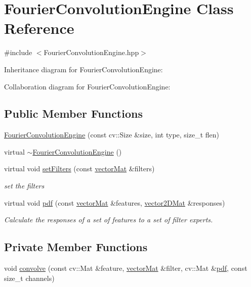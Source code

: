 \hypertarget{classFourierConvolutionEngine}{}\section{Fourier\+Convolution\+Engine Class Reference}
\label{classFourierConvolutionEngine}


{\ttfamily \#include $<$Fourier\+Convolution\+Engine.\+hpp$>$}



Inheritance diagram for Fourier\+Convolution\+Engine\+:


Collaboration diagram for Fourier\+Convolution\+Engine\+:
\subsection*{Public Member Functions}
\begin{DoxyCompactItemize}
\item 
\hyperlink{classFourierConvolutionEngine_a30d60a44b5767b43a4042171cf813fcd}{Fourier\+Convolution\+Engine} (const cv\+::\+Size \&size, int type, size\+\_\+t flen)
\item 
virtual \hyperlink{classFourierConvolutionEngine_a827dafdecfbb07891fbeee998af60236}{$\sim$\+Fourier\+Convolution\+Engine} ()
\item 
virtual void \hyperlink{classFourierConvolutionEngine_ad895979797d38a7c97e8dfcca9571fd2}{set\+Filters} (const \hyperlink{types_8hpp_a3207a7addcfa415d1c83622febcb1e9b}{vector\+Mat} \&filters)
\begin{DoxyCompactList}\small\item\em set the filters \end{DoxyCompactList}\item 
virtual void \hyperlink{classFourierConvolutionEngine_a30e84c8f67a198d318780e247efbbe41}{pdf} (const \hyperlink{types_8hpp_a3207a7addcfa415d1c83622febcb1e9b}{vector\+Mat} \&features, \hyperlink{types_8hpp_a33cacb85be7b8df3dc0b67d5d849f4cc}{vector2\+D\+Mat} \&responses)
\begin{DoxyCompactList}\small\item\em Calculate the responses of a set of features to a set of filter experts. \end{DoxyCompactList}\end{DoxyCompactItemize}
\subsection*{Private Member Functions}
\begin{DoxyCompactItemize}
\item 
void \hyperlink{classFourierConvolutionEngine_aaa0df468a2857c391459d3c9a53a6fc6}{convolve} (const cv\+::\+Mat \&feature, \hyperlink{types_8hpp_a3207a7addcfa415d1c83622febcb1e9b}{vector\+Mat} \&filter, cv\+::\+Mat \&\hyperlink{classFourierConvolutionEngine_a30e84c8f67a198d318780e247efbbe41}{pdf}, const size\+\_\+t channels)
\end{DoxyCompactItemize}
